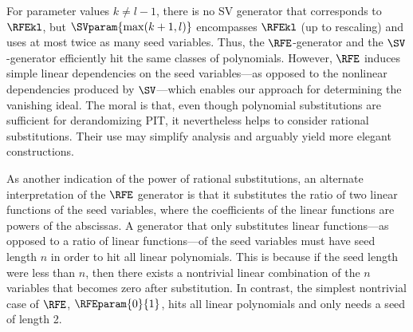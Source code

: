 \documentclass{toc}
\begin{document}
For parameter values $k \ne l-1$,
there is no SV generator that corresponds to $\RFEkl$,
but $\SVparam{\max(k+1,l)}$ encompasses $\RFEkl$ (up to rescaling)
and uses at most twice as many seed variables.
Thus, the $\RFE$-generator and the $\SV$-generator efficiently hit the same
classes of polynomials.
However, $\RFE$ induces simple linear dependencies on the seed variables---as opposed 
to the nonlinear dependencies produced by $\SV$---which enables our approach for determining the vanishing ideal.
The moral is that,
even though polynomial substitutions are sufficient for derandomizing PIT,
it nevertheless helps to consider rational substitutions.
Their use may simplify analysis
and arguably yield more elegant constructions.

As another indication of the power of rational substitutions, an alternate interpretation of the $\RFE$ generator is that it substitutes the ratio of two linear functions of the seed variables, where the coefficients of the linear functions are powers of the abscissas. A generator that only substitutes linear functions---as opposed to a ratio of linear functions---of the seed variables must have seed length $n$ in order to hit all linear polynomials. This is because if the seed length were less than $n$, then there exists a nontrivial linear combination of the $n$ variables that becomes zero after substitution. In contrast, the simplest nontrivial case of $\RFE$, $\RFEparam{0}{1}$, hits all linear polynomials and only needs a seed of length 2. 
\end{document}
